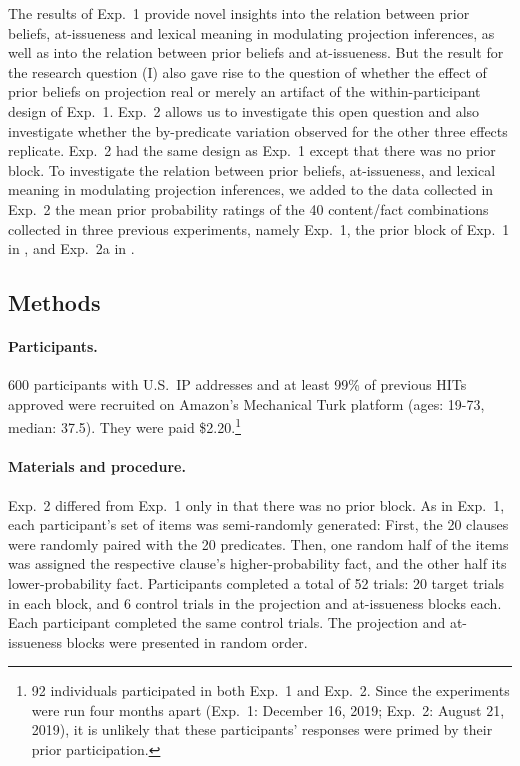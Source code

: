 \documentclass[11pt,fleqn]{article}
\newcommand{\6}{\mbox{$[\hspace*{-.6mm}[$}}
\newcommand{\9}{\mbox{$]\hspace*{-.6mm}]$}}
\begin{document}
The results of Exp.~1 provide novel insights into the relation between prior beliefs, at-issueness and lexical meaning in modulating projection inferences, as well as into the relation between prior beliefs and at-issueness. But the result for the research question (I) also gave rise to the question of whether the effect of prior beliefs on projection real or merely an artifact of the within-participant design of Exp.~1. Exp.~2 allows us to investigate this open question and also investigate whether the by-predicate variation observed for the other three effects replicate. Exp.~2 had the same design as Exp.~1 except that there was no prior block. To investigate the relation between prior beliefs, at-issueness, and lexical meaning in modulating projection inferences, we added to the data collected in Exp.~2 the mean prior probability ratings of the 40 content/fact combinations collected in three previous experiments, namely Exp.~1, the prior block of Exp.~1 in \citealt{degen-tonhauser-openmind}, and Exp.~2a in \citealt{degen-tonhauser-openmind}. 

\subsection{Methods}

\paragraph{Participants.} 600 participants with U.S.\ IP addresses and at least 99\% of previous HITs approved were recruited on Amazon's Mechanical Turk platform (ages: 19-73, median: 37.5). They were paid \$2.20.\footnote{92 individuals participated in both Exp.~1 and Exp.~2. Since the experiments were run four months apart (Exp.~1: December 16, 2019; Exp.~2: August 21, 2019), it is unlikely that these participants' responses were primed by their prior participation.}

\paragraph{Materials and procedure.}  Exp.~2 differed from Exp.~1 only in that there was no prior block. As in Exp.~1, each participant's set of items was semi-randomly generated: First, the 20 clauses were randomly paired with the 20 predicates. Then, one random half of the items was assigned the respective clause's higher-probability fact, and the other half its lower-probability fact. Participants completed a total of 52 trials: 20 target trials in each block, and 6 control trials in the projection and at-issueness blocks each. Each participant completed the same control trials. The projection and at-issueness blocks were presented in random order. 
\end{document}
